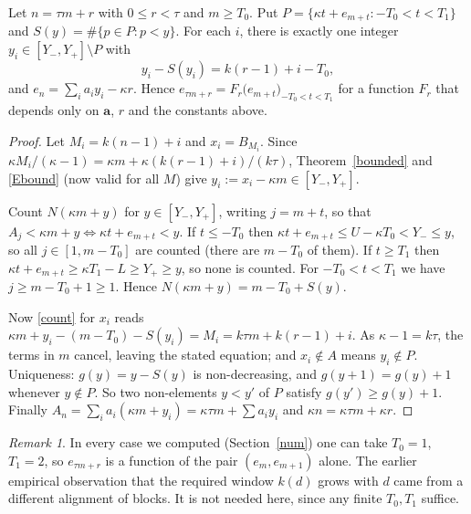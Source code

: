 \documentclass[11pt]{article}
\theoremstyle{remark}\newtheorem{remark}[theorem]{Remark}
\theoremstyle{definition}\newtheorem{definition}[theorem]{Definition}
\begin{document}
\begin{proposition}\label{local}
Let \(n=\tau m+r\) with \(0\le r<\tau\) and \(m\ge T_0\). Put \(P=\{\kappa t+e_{m+t}: -T_0<t<T_1\}\) and \(S(y)=\#\{p\in P:p<y\}\). For each \(i\), there is exactly one integer \(y_i\in[Y_-,Y_+]\setminus P\) with
\[ y_i-S(y_i)=k(r-1)+i-T_0, \]
and \(e_n=\sum_i a_iy_i-\kappa r\). Hence \(e_{\tau m+r}=F_r\bigl(e_{m+t}\bigr)_{-T_0<t<T_1}\) for a function \(F_r\) that depends only on \(\mathbf a\), \(r\) and the constants above.
\end{proposition}
\begin{proof}
Let \(M_i=k(n-1)+i\) and \(x_i=B_{M_i}\). Since \(\kappa M_i/(\kappa-1)=\kappa m+\kappa(k(r-1)+i)/(k\tau)\), Theorem~\ref{bounded} and \eqref{Ebound} (now valid for all \(M\)) give \(y_i:=x_i-\kappa m\in[Y_-,Y_+]\).

Count \(N(\kappa m+y)\) for \(y\in[Y_-,Y_+]\), writing \(j=m+t\), so that \(A_j<\kappa m+y\iff \kappa t+e_{m+t}<y\). If \(t\le-T_0\) then \(\kappa t+e_{m+t}\le U-\kappa T_0<Y_-\le y\), so all \(j\in[1,m-T_0]\) are counted (there are \(m-T_0\) of them). If \(t\ge T_1\) then \(\kappa t+e_{m+t}\ge \kappa T_1-L\ge Y_+\ge y\), so none is counted. For \(-T_0<t<T_1\) we have \(j\ge m-T_0+1\ge1\). Hence \(N(\kappa m+y)=m-T_0+S(y)\).

Now \eqref{count} for \(x_i\) reads \(\kappa m+y_i-(m-T_0)-S(y_i)=M_i=k\tau m+k(r-1)+i\). As \(\kappa-1=k\tau\), the terms in \(m\) cancel, leaving the stated equation; and \(x_i\notin A\) means \(y_i\notin P\).
Uniqueness: \(g(y)=y-S(y)\) is non-decreasing, and \(g(y+1)=g(y)+1\) whenever \(y\notin P\). So two non-elements \(y<y'\) of \(P\) satisfy \(g(y')\ge g(y)+1\).
Finally \(A_n=\sum_ia_i(\kappa m+y_i)=\kappa\tau m+\sum a_iy_i\) and \(\kappa n=\kappa\tau m+\kappa r\).
\end{proof}

\begin{remark}
In every case we computed (Section~\ref{num}) one can take \(T_0=1\), \(T_1=2\), so \(e_{\tau m+r}\) is a function of the pair \((e_m,e_{m+1})\) alone. The earlier empirical observation that the required window \(k(d)\) grows with \(d\) came from a different alignment of blocks. It is not needed here, since any finite \(T_0,T_1\) suffice.
\end{remark}
\end{document}
